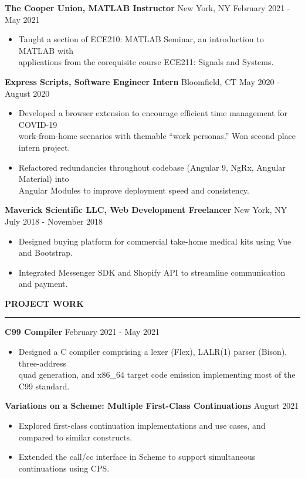 \documentclass[]{article}
\newcommand{\br}{\vspace{10pt}}
\newcommand{\brs}{\vspace{3pt}}
\newcommand{\hr}{\vspace{4pt}\hrule\vspace{4pt}}
\begin{document}
\brs

\textbf{The Cooper Union, MATLAB Instructor}
New York, NY
\hfill
February 2021 - May 2021
\begin{itemize}
\item Taught a section of ECE210: MATLAB Seminar, an introduction to MATLAB with
  \\ applications from the corequisite course ECE211: Signals and Systems.
\end{itemize}

\brs

\textbf{Express Scripts, Software Engineer Intern}
Bloomfield, CT
\hfill
May 2020 - August 2020
\begin{itemize}
\item Developed a browser extension to encourage efficient time management for
  COVID-19\\ work-from-home scenarios with themable ``work personas.'' Won
  second place intern project.
\item Refactored redundancies throughout codebase (Angular 9, NgRx, Angular
  Material) into\\ Angular Modules to improve deployment speed and consistency.
\end{itemize}

\brs

\textbf{Maverick Scientific LLC, Web Development Freelancer}
New York, NY
\hfill
July 2018 - November 2018
\begin{itemize}
\item Designed buying platform for commercial take-home medical kits using Vue
  and Bootstrap.
\item Integrated Messenger SDK and Shopify API to streamline communication
  and payment.
\end{itemize}

\br

\textbf{PROJECT WORK}
\hr

\textbf{C99 Compiler}
\hfill
February 2021 - May 2021
\begin{itemize}
\item Designed a C compiler comprising a lexer (Flex), LALR(1) parser (Bison),
  three-address \\ quad generation, and x86\_64 target code emission
  implementing most of the C99 standard.
\end{itemize}

\brs


\textbf{Variations on a Scheme: Multiple First-Class Continuations}
\hfill
August 2021
\begin{itemize}
\item Explored first-class continuation implementations and use cases, and compared to similar constructs.
\item Extended the call/cc interface in Scheme to support simultaneous continuations using CPS.
\end{itemize}
\end{document}
